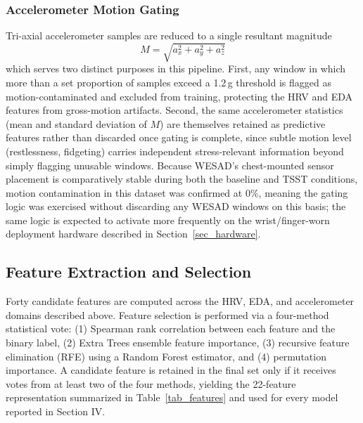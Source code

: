 \documentclass[conference]{IEEEtran}
\begin{document}
\subsubsection{Accelerometer Motion Gating}
Tri-axial accelerometer samples are reduced to a single
resultant magnitude
\begin{equation}
M = \sqrt{a_x^2 + a_y^2 + a_z^2}
\label{eq_acc}
\end{equation}
which serves two distinct purposes in this pipeline. First, any
window in which more than a set proportion of samples exceed
a 1.2\,g threshold is flagged as motion-contaminated and
excluded from training, protecting the HRV and EDA features
from gross-motion artifacts. Second, the same accelerometer
statistics (mean and standard deviation of $M$) are themselves
retained as predictive features rather than discarded once
gating is complete, since subtle motion level (restlessness,
fidgeting) carries independent stress-relevant information
beyond simply flagging unusable windows. Because WESAD's
chest-mounted sensor placement is comparatively stable during
both the baseline and TSST conditions, motion contamination
in this dataset was confirmed at 0\%, meaning the gating logic
was exercised without discarding any WESAD windows on this
basis; the same logic is expected to activate more frequently
on the wrist/finger-worn deployment hardware described in
Section~\ref{sec_hardware}.

\subsection{Feature Extraction and Selection}
Forty candidate features are computed across the HRV, EDA,
and accelerometer domains described above. Feature selection
is performed via a four-method statistical vote: (1) Spearman
rank correlation between each feature and the binary label,
(2) Extra Trees ensemble feature importance, (3) recursive
feature elimination (RFE) using a Random Forest estimator, and
(4) permutation importance. A candidate feature is retained in
the final set only if it receives votes from at least two of
the four methods, yielding the 22-feature representation
summarized in Table~\ref{tab_features} and used for every
model reported in Section IV.
\end{document}
